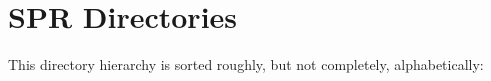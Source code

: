 \section{SPR Directories}
This directory hierarchy is sorted roughly, but not completely, alphabetically:\begin{CompactList}
\item {}
\end{CompactList}
